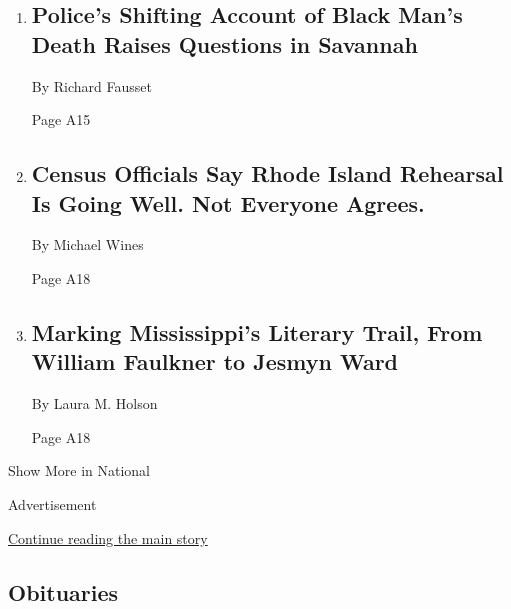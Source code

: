\begin{enumerate}
\def\labelenumi{\arabic{enumi}.}
\item
  \href{/2018/04/28/us/polices-shifting-account-of-black-mans-death-raises-questions-in-savannah.html}{}

  \hypertarget{polices-shifting-account-of-black-mans-death-raises-questions-in-savannah-1}{%
  \subsection{Police's Shifting Account of Black Man's Death Raises
  Questions in
  Savannah}\label{polices-shifting-account-of-black-mans-death-raises-questions-in-savannah-1}}

  By Richard Fausset

  Page A15
\item
  \href{/2018/04/28/us/2020-census-test-rhode-island.html}{}

  \hypertarget{census-officials-say-rhode-island-rehearsal-is-going-well-not-everyone-agrees}{%
  \subsection{Census Officials Say Rhode Island Rehearsal Is Going Well.
  Not Everyone
  Agrees.}\label{census-officials-say-rhode-island-rehearsal-is-going-well-not-everyone-agrees}}

  By Michael Wines

  Page A18
\item
  \href{/2018/04/27/books/books-mississippi-faulkner-trail.html}{}

  \hypertarget{marking-mississippis-literary-trail-from-william-faulkner-to-jesmyn-ward}{%
  \subsection{Marking Mississippi's Literary Trail, From William
  Faulkner to Jesmyn
  Ward}\label{marking-mississippis-literary-trail-from-william-faulkner-to-jesmyn-ward}}

  By Laura M. Holson

  Page A18
\end{enumerate}

Show More in National

Advertisement

\protect\hyperlink{after-mid2}{Continue reading the main story}

\hypertarget{obituaries}{%
\subsection{Obituaries}\label{obituaries}}

